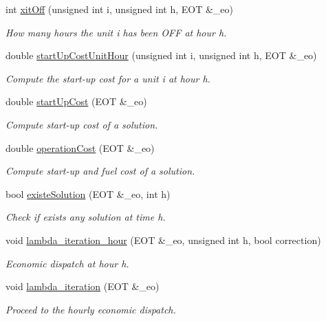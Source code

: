 \begin{DoxyCompactItemize}
int \hyperlink{classeo_u_c_p_eval_func_a3953949fb708c8301a5192cec673ef26}{xit\-Off} (unsigned int i, unsigned int h, \-E\-O\-T \&\-\_\-eo)
\begin{DoxyCompactList}\small\item\em \-How many hours the unit i has been \-O\-F\-F at hour h. \end{DoxyCompactList}\item 
double \hyperlink{classeo_u_c_p_eval_func_a523b9a5233de913b178eadf6ca92b74d}{start\-Up\-Cost\-Unit\-Hour} (unsigned int i, unsigned int h, \-E\-O\-T \&\-\_\-eo)
\begin{DoxyCompactList}\small\item\em \-Compute the start-\/up cost for a unit i at hour h. \end{DoxyCompactList}\item 
double \hyperlink{classeo_u_c_p_eval_func_a6b6c42bc89c52a3b01b9356a1ca4c22d}{start\-Up\-Cost} (\-E\-O\-T \&\-\_\-eo)
\begin{DoxyCompactList}\small\item\em \-Compute start-\/up cost of a solution. \end{DoxyCompactList}\item 
double \hyperlink{classeo_u_c_p_eval_func_ae86204361d698938a778a9eebc064b70}{operation\-Cost} (\-E\-O\-T \&\-\_\-eo)
\begin{DoxyCompactList}\small\item\em \-Compute start-\/up and fuel cost of a solution. \end{DoxyCompactList}\item 
bool \hyperlink{classeo_u_c_p_eval_func_a270e21462b4bdf5a6ca974d2b1a51fee}{existe\-Solution} (\-E\-O\-T \&\-\_\-eo, int h)
\begin{DoxyCompactList}\small\item\em \-Check if exists any solution at time h. \end{DoxyCompactList}\item 
void \hyperlink{classeo_u_c_p_eval_func_a0d185b7ac7ce018301e313784f757193}{lambda\-\_\-iteration\-\_\-hour} (\-E\-O\-T \&\-\_\-eo, unsigned int h, bool correction)
\begin{DoxyCompactList}\small\item\em \-Economic dispatch at hour h. \end{DoxyCompactList}\item 
void \hyperlink{classeo_u_c_p_eval_func_afc58593def6253549f19e97da86badb0}{lambda\-\_\-iteration} (\-E\-O\-T \&\-\_\-eo)
\begin{DoxyCompactList}\small\item\em \-Proceed to the hourly economic dispatch. \end{DoxyCompactList}\item 

\end{DoxyCompactItemize}
